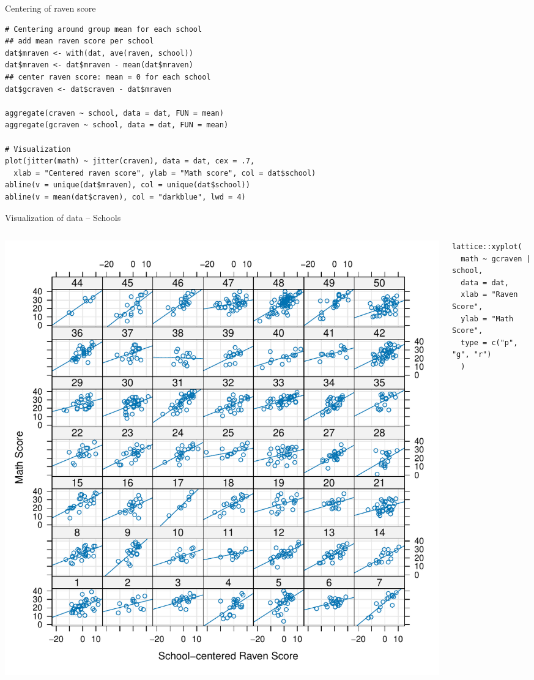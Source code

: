 \documentclass[aspectratio=169]{beamer}
\begin{document}
\begin{frame}[fragile]{Centering of raven score}
  \begin{lstlisting}
# Centering around group mean for each school
## add mean raven score per school
dat$mraven <- with(dat, ave(raven, school))
dat$mraven <- dat$mraven - mean(dat$mraven)
## center raven score: mean = 0 for each school
dat$gcraven <- dat$craven - dat$mraven

aggregate(craven ~ school, data = dat, FUN = mean)
aggregate(gcraven ~ school, data = dat, FUN = mean)

# Visualization
plot(jitter(math) ~ jitter(craven), data = dat, cex = .7,
  xlab = "Centered raven score", ylab = "Math score", col = dat$school)
abline(v = unique(dat$mraven), col = unique(dat$school))
abline(v = mean(dat$craven), col = "darkblue", lwd = 4)
  \end{lstlisting}
\end{frame}

\begin{frame}[fragile]{Visualization of data -- Schools}
  \begin{columns}
    \begin{column}{.6\textwidth}
      \includegraphics[scale=.44]{../figures/jsp_lattice1}
    \end{column}
    \begin{column}{.4\textwidth}
\begin{lstlisting}
lattice::xyplot(
  math ~ gcraven | school,
  data = dat,
  xlab = "Raven Score",
  ylab = "Math Score",
  type = c("p", "g", "r")
  )
\end{lstlisting}
    \end{column}
  \end{columns}
\end{frame}
\end{document}
